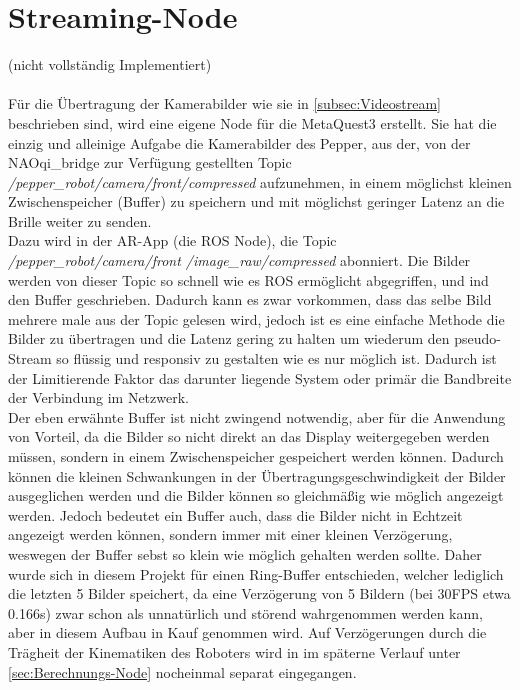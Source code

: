 \section{Streaming-Node}\label{sec:Streaming-Node}
(nicht vollständig Implementiert)\\\\
Für die Übertragung der Kamerabilder wie sie in \autoref{subsec:Videostream} beschrieben sind, wird eine eigene Node für die MetaQuest3 erstellt. Sie hat die einzig und alleinige Aufgabe die Kamerabilder des Pepper, aus der, von der NAOqi\_bridge zur Verfügung gestellten Topic \textit{/pepper\_robot/camera/front/compressed} aufzunehmen, in einem möglichst kleinen Zwischenspeicher (Buffer) zu speichern und mit möglichst geringer Latenz an die Brille weiter zu senden.\\
Dazu wird in der \ac{AR}-App (die \ac{ROS} Node), die Topic \textit{/pepper\_robot/camera/front /image\_raw/compressed} abonniert. Die Bilder werden von dieser Topic so schnell wie es \ac{ROS} ermöglicht abgegriffen, und ind den Buffer geschrieben. Dadurch kann es zwar vorkommen, dass das selbe Bild mehrere male aus der Topic gelesen wird, jedoch ist es eine einfache Methode die Bilder zu übertragen und die Latenz gering zu halten um wiederum den pseudo-Stream so flüssig und responsiv zu gestalten wie es nur möglich ist. Dadurch ist der Limitierende Faktor das darunter liegende System oder primär die Bandbreite der Verbindung im Netzwerk.\\
Der eben erwähnte Buffer ist nicht zwingend notwendig, aber für die Anwendung von Vorteil, da die Bilder so nicht direkt an das Display weitergegeben werden müssen, sondern in einem Zwischenspeicher gespeichert werden können. Dadurch können die kleinen Schwankungen in der Übertragungsgeschwindigkeit der Bilder ausgeglichen werden und die Bilder können so gleichmäßig wie möglich angezeigt werden. Jedoch bedeutet ein Buffer auch, dass die Bilder nicht in Echtzeit angezeigt werden können, sondern immer mit einer kleinen Verzögerung, weswegen der Buffer sebst so klein wie möglich gehalten werden sollte. Daher wurde sich in diesem Projekt für einen Ring-Buffer entschieden, welcher lediglich die letzten 5 Bilder speichert, da eine Verzögerung von 5 Bildern (bei 30\ac{FPS} etwa 0.166s) zwar schon als unnatürlich und störend wahrgenommen werden kann, aber in diesem Aufbau in Kauf genommen wird. Auf Verzögerungen durch die Trägheit der Kinematiken des Roboters wird in im späterne Verlauf unter \autoref{sec:Berechnungs-Node} nocheinmal separat eingegangen.\\
